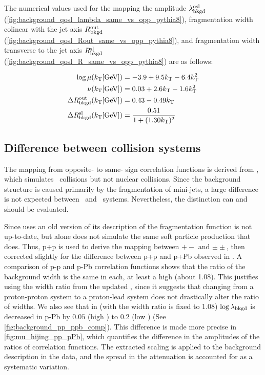 The numerical values used for the mapping the amplitude $\lambda_{\mathrm{bkgd}}^\mathrm{osl}$ (\cref{fig:background_qosl_lambda_same_vs_opp_pythia8}), fragmentation width colinear with the jet axis $R_{\mathrm{bkgd}}^\mathrm{out}$ (\cref{fig:background_qosl_Rout_same_vs_opp_pythia8}), and fragmentation width transverse to the jet axis $R_{\mathrm{bkgd}}^\mathrm{sl}$ (\cref{fig:background_qosl_R_same_vs_opp_pythia8}) are as follows:

\begin{align}
\log \mu (k_\mathrm{T} [\textrm{GeV}]) &= -3.9 + 9.5 k_\mathrm{T} - 6.4 k_\mathrm{T}^2 \label{eqn:mu_osl}\\
\nu(k_\mathrm{T} [\textrm{GeV}]) &= 0.03 + 2.6 k_\mathrm{T} - 1.6 k_\mathrm{T}^2 \label{eqn:nu_osl}\\
\Delta R_{\mathrm{bkgd}}^\mathrm{out} (k_\mathrm{T} [\textrm{GeV}]) &= 0.43 - 0.49 k_\mathrm{T} \label{eqn_rbkgdout}\\
\Delta R_{\mathrm{bkgd}}^\mathrm{sl} (k_\mathrm{T} [\textrm{GeV}]) &= \frac{0.51}{1 + (1.30k_\mathrm{T})^2} \label{eqn_rbkgdsl}
\end{align}

\subsection{Difference between collision systems}

The mapping from opposite- to same- sign correlation functions is derived from , which simulates \pp~collisions but not nuclear collisions.
Since the background structure is caused primarily by the fragmentation of mini-jets, a large difference is not expected between \pp~and \pPb~systems.
Nevertheless, the distinction can and should be evaluated.

Since \Hijing uses an old version of  its description of the fragmentation function is not up-to-date, but \Pythia alone does not simulate the same soft particle production that \Hijing does.
Thus, \PYEight p+p is used to derive the mapping between $+-$ and $\pm\pm$, then corrected slightly for the difference between p+p and p+Pb observed in \Hijing.
A comparison of \Hijing p-p and p-Pb correlation functions shows that the ratio of the background width is the same in each, at least a high \kt (about 1.08).
This justifies using the width ratio from the updated \PYEight, since it suggests that changing from a proton-proton system to a proton-lead system does not drastically alter the ratio of widths.
We also see that in \Hijing (with the width ratio is fixed to 1.08) $\log \lambda_{\mathrm{bkgd}}$ is decreased in p-Pb by $0.05$ (high \kt) to $0.2$ (low \kt) (See \cref{fig:background_pp_ppb_comp}). This difference is made more precise in \cref{fig:mu_hijing_pp_pPb}, which quantifies the difference in the amplitudes of the ratios of correlation functions.
The extracted scaling is applied to the background description in the data, and the spread in the attenuation is accounted for as a systematic variation.

